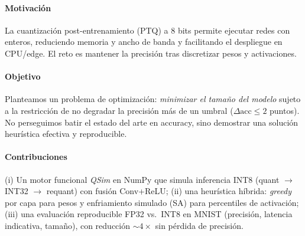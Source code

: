 \paragraph{Motivación}
La cuantización post-entrenamiento (PTQ) a 8 bits permite ejecutar redes con enteros, reduciendo memoria y ancho de banda y facilitando el despliegue en CPU/edge. El reto es mantener la precisión tras discretizar pesos y activaciones.

\paragraph{Objetivo}
Planteamos un problema de optimización: \emph{minimizar el tamaño del modelo} sujeto a la restricción de no degradar la precisión más de un umbral ($\Delta\mathrm{acc}\leq 2$ puntos). No perseguimos batir el estado del arte en accuracy, sino demostrar una solución heurística efectiva y reproducible.

\paragraph{Contribuciones}
(i) Un motor funcional \emph{QSim} en NumPy que simula inferencia INT8 (quant $\rightarrow$ INT32 $\rightarrow$ requant) con fusión Conv+ReLU; (ii) una heurística híbrida: \emph{greedy} por capa para pesos y enfriamiento simulado (SA) para percentiles de activación; (iii) una evaluación reproducible FP32 vs.\ INT8 en MNIST (precisión, latencia indicativa, tamaño), con reducción $\sim 4\times$ sin pérdida de precisión.
